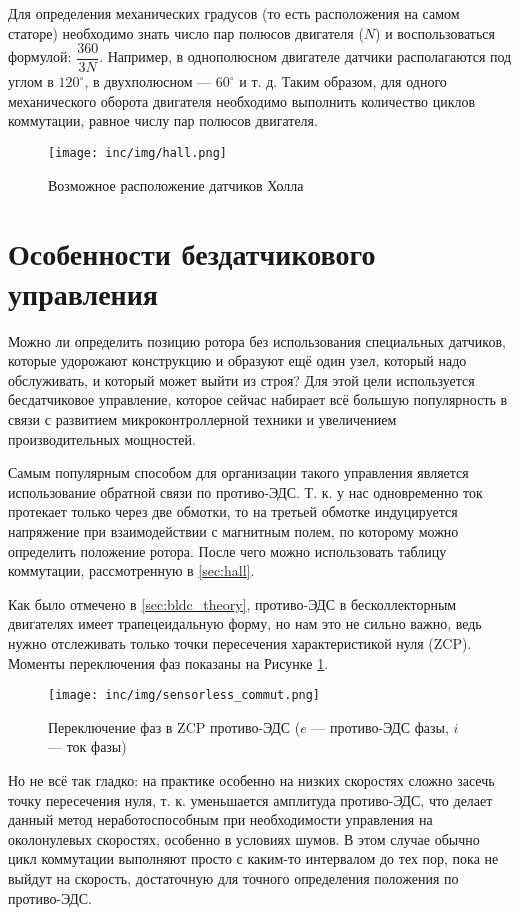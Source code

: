 Для определения механических градусов (то есть расположения на самом статоре) необходимо знать число пар полюсов двигателя ($N$) и воспользоваться формулой: $\dfrac{360}{3N}$. Например, в однополюсном двигателе датчики располагаются под углом в $120^{\circ}$, в двухполюсном --- $60^{\circ}$ и т. д. Таким образом, для одного механического оборота двигателя необходимо выполнить количество циклов коммутации, равное числу пар полюсов двигателя.

\begin{figure}[!h]
\centering
\texttt{[image: inc/img/hall.png]}
\caption{Возможное расположение датчиков Холла}
\end{figure}

\section{Особенности бездатчикового управления}
\label{sec:sensorless_ways}

Можно ли определить позицию ротора без использования специальных датчиков, которые удорожают конструкцию и образуют ещё один узел, который надо обслуживать, и который может выйти из строя? Для этой цели используется бесдатчиковое управление, которое сейчас набирает всё большую популярность в связи с развитием микроконтроллерной техники и увеличением производительных мощностей.

Самым популярным способом для организации такого управления является использование обратной связи по противо-ЭДС. Т. к. у нас одновременно ток протекает только через две обмотки, то на третьей обмотке индуцируется напряжение при взаимодействии с магнитным полем, по которому можно определить положение ротора. После чего можно использовать таблицу коммутации, рассмотренную в \ref{sec:hall}.

Как было отмечено в \ref{sec:bldc_theory}, противо-ЭДС в бесколлекторным двигателях имеет трапецеидальную форму, но нам это не сильно важно, ведь нужно отслеживать только точки пересечения характеристикой нуля (ZCP). Моменты переключения фаз показаны на Рисунке \ref{pic:sensorless_commut}.

\begin{figure}[!h]
\centering
\texttt{[image: inc/img/sensorless\_commut.png]}
\caption{Переключение фаз в ZCP противо-ЭДС ($e$ --- противо-ЭДС фазы, $i$ --- ток фазы)}
\label{pic:sensorless_commut}
\end{figure}

Но не всё так гладко: на практике особенно на низких скоростях сложно засечь точку пересечения нуля, т. к. уменьшается амплитуда противо-ЭДС, что делает данный метод неработоспособным при необходимости управления на околонулевых скоростях, особенно в условиях шумов. В этом случае обычно цикл коммутации выполняют просто с каким-то интервалом до тех пор, пока не выйдут на скорость, достаточную для точного определения положения по противо-ЭДС.


